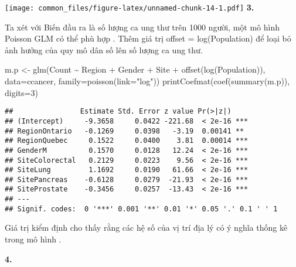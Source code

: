 \documentclass[
]{article}
\newenvironment{Shaded}{\begin{snugshade}}{\end{snugshade}}
\newcommand{\AttributeTok}[1]{\textcolor[rgb]{0.77,0.63,0.00}{#1}}
\newcommand{\DecValTok}[1]{\textcolor[rgb]{0.00,0.00,0.81}{#1}}
\newcommand{\FunctionTok}[1]{\textcolor[rgb]{0.00,0.00,0.00}{#1}}
\newcommand{\NormalTok}[1]{#1}
\newcommand{\OtherTok}[1]{\textcolor[rgb]{0.56,0.35,0.01}{#1}}
\newcommand{\SpecialCharTok}[1]{\textcolor[rgb]{0.00,0.00,0.00}{#1}}
\newcommand{\StringTok}[1]{\textcolor[rgb]{0.31,0.60,0.02}{#1}}
\begin{document}
\texttt{[image: common\_files/figure-latex/unnamed-chunk-14-1.pdf]}
\textbf{3.}

Ta xét với Biến đầu ra là số lượng ca ung thư trên 1000 người, một mô
hình Poisson GLM có thể phù hợp . Thêm giá trị offset = log(Population)
để loại bỏ ảnh hưởng của quy mô dân số lên số lượng ca ung thư.

\begin{Shaded}
\begin{Highlighting}[]
\NormalTok{m.p }\OtherTok{\textless{}{-}} \FunctionTok{glm}\NormalTok{(Count }\SpecialCharTok{\textasciitilde{}}\NormalTok{ Region }\SpecialCharTok{+}\NormalTok{ Gender }\SpecialCharTok{+}\NormalTok{ Site }\SpecialCharTok{+} \FunctionTok{offset}\NormalTok{(}\FunctionTok{log}\NormalTok{(Population)), }\AttributeTok{data=}\NormalTok{ccancer, }\AttributeTok{family=}\FunctionTok{poisson}\NormalTok{(}\AttributeTok{link=}\StringTok{"log"}\NormalTok{))}
\FunctionTok{printCoefmat}\NormalTok{(}\FunctionTok{coef}\NormalTok{(}\FunctionTok{summary}\NormalTok{(m.p)), }\AttributeTok{digits=}\DecValTok{3}\NormalTok{)}
\end{Highlighting}
\end{Shaded}

\begin{verbatim}
##                Estimate Std. Error z value Pr(>|z|)    
## (Intercept)     -9.3658     0.0422 -221.68  < 2e-16 ***
## RegionOntario   -0.1269     0.0398   -3.19  0.00141 ** 
## RegionQuebec     0.1522     0.0400    3.81  0.00014 ***
## GenderM          0.1570     0.0128   12.24  < 2e-16 ***
## SiteColorectal   0.2129     0.0223    9.56  < 2e-16 ***
## SiteLung         1.1692     0.0190   61.66  < 2e-16 ***
## SitePancreas    -0.6128     0.0279  -21.93  < 2e-16 ***
## SiteProstate    -0.3456     0.0257  -13.43  < 2e-16 ***
## ---
## Signif. codes:  0 '***' 0.001 '**' 0.01 '*' 0.05 '.' 0.1 ' ' 1
\end{verbatim}

Giá trị kiểm định cho thấy rằng các hệ số của vị trí địa lý có ý nghĩa
thống kê trong mô hình .

\textbf{4.}
\end{document}
